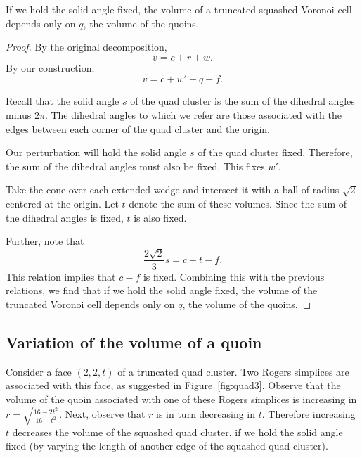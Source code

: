\begin{lem}
\label{lem:pure:inv}
If we hold the solid angle fixed, the volume of a truncated squashed
Voronoi cell depends only on $q$, the volume of the quoins.
\end{lem}
\begin{proof}
By the original decomposition,
\[
v = c + r + w.
\]
By our construction,
\[
v = c + w' + q - f.
\]

Recall that the
solid angle $s$ of the quad cluster is the sum of the
dihedral angles minus $2\pi$.
The dihedral angles to which we refer are those
associated with the edges between each corner
of the quad cluster and the origin.

Our perturbation will hold the solid angle $s$ of the quad cluster
fixed.  Therefore,
the sum of the dihedral angles must also be fixed.
This fixes $w'$.

Take the cone over each extended wedge and intersect it with
a ball of radius $\sqrt{2}$ centered at the origin.
Let $t$ denote the sum of these volumes.  Since the sum
of the dihedral angles is fixed, $t$ is also fixed.

Further, note that
\[
\frac{2\sqrt{2}}{3} s = c + t - f.
\]
This relation implies that $c-f$ is fixed.  Combining this with
the previous relations, we find that if we hold the solid angle
fixed, the volume of the truncated Voronoi cell depends only
on $q$, the volume of the quoins.
\end{proof}

\subsection{Variation of the volume of a quoin}

Consider a face $(2,2,t)$ of a truncated quad cluster.
Two Rogers simplices are associated with this face, as
suggested in Figure~\ref{fig:quad3}.
Observe that the volume of the quoin associated with one
of these Rogers simplices is increasing
in $r = \sqrt{\frac{16-2t^2}{16-t^2}}$.
Next, observe that $r$ is in turn decreasing in
$t$.
Therefore increasing $t$ decreases the volume
of the squashed quad cluster, if we hold the solid angle fixed (by varying
the length of another edge of the squashed quad cluster).

